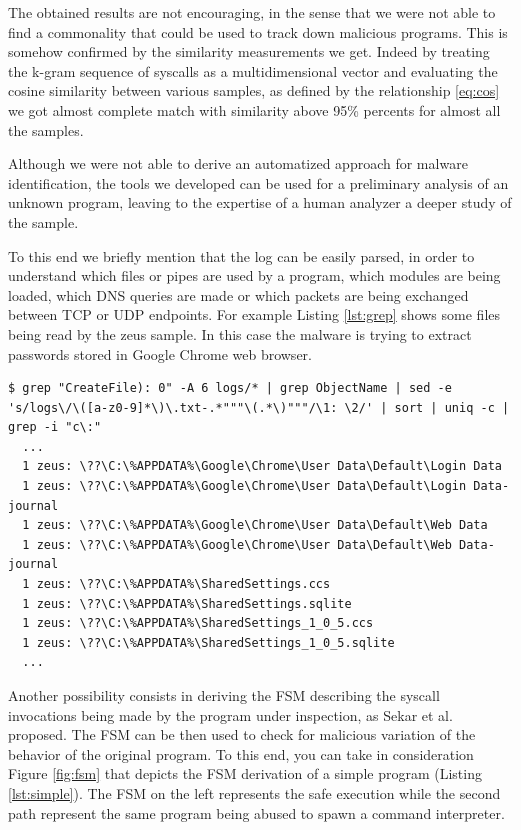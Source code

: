 \documentclass{article}
\begin{document}
The obtained results are not encouraging, in the sense that we were not able to find a commonality that could be used to track down malicious programs. This is somehow confirmed by the similarity measurements we get. Indeed by treating the k-gram sequence of syscalls as a multidimensional vector and evaluating the cosine similarity between various samples, as defined by the relationship \ref{eq:cos} we got almost complete match with similarity above 95\% percents for almost all the samples.


Although we were not able to derive an automatized approach for malware identification, the tools we developed can be used for a preliminary analysis of an unknown program, leaving to the expertise of a human analyzer a deeper study of the sample.

To this end we briefly mention that the log can be easily parsed, in order to understand which files or pipes are used by a program, which modules are being loaded, which DNS queries are made or which packets are being exchanged between TCP or UDP endpoints. For example Listing \ref{lst:grep} shows some files being read by the zeus sample. In this case the malware is trying to extract passwords stored in Google Chrome web browser.

\begin{lstlisting}
$ grep "CreateFile): 0" -A 6 logs/* | grep ObjectName | sed -e 's/logs\/\([a-z0-9]*\)\.txt-.*"""\(.*\)"""/\1: \2/' | sort | uniq -c | grep -i "c\:"
  ...
  1 zeus: \??\C:\%APPDATA%\Google\Chrome\User Data\Default\Login Data
  1 zeus: \??\C:\%APPDATA%\Google\Chrome\User Data\Default\Login Data-journal
  1 zeus: \??\C:\%APPDATA%\Google\Chrome\User Data\Default\Web Data
  1 zeus: \??\C:\%APPDATA%\Google\Chrome\User Data\Default\Web Data-journal
  1 zeus: \??\C:\%APPDATA%\SharedSettings.ccs
  1 zeus: \??\C:\%APPDATA%\SharedSettings.sqlite
  1 zeus: \??\C:\%APPDATA%\SharedSettings_1_0_5.ccs
  1 zeus: \??\C:\%APPDATA%\SharedSettings_1_0_5.sqlite
  ...
\end{lstlisting}

Another possibility consists in deriving the FSM describing the syscall invocations being made by the program under inspection, as Sekar et al. proposed. The FSM can be then used to check for malicious variation of the behavior of the original program. To this end, you can take in consideration Figure \ref{fig:fsm} that depicts the FSM derivation of a simple program (Listing \ref{lst:simple}). The FSM on the left represents the safe execution while the second path represent the same program being abused to spawn a command interpreter.
\end{document}
